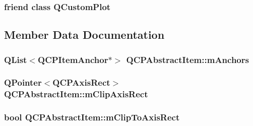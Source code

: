 \subsubsection[{Q\+Custom\+Plot}]{\setlength{\rightskip}{0pt plus 5cm}friend class {\bf Q\+Custom\+Plot}\hspace{0.3cm}{\ttfamily [friend]}}\label{class_q_c_p_abstract_item_a1cdf9df76adcfae45261690aa0ca2198}


\subsection{Member Data Documentation}
\hypertarget{class_q_c_p_abstract_item_a909a3abab783de302ebf0a0e6f2bbc15}{}
\subsubsection[{m\+Anchors}]{\setlength{\rightskip}{0pt plus 5cm}Q\+List$<${\bf Q\+C\+P\+Item\+Anchor}$\ast$$>$ Q\+C\+P\+Abstract\+Item\+::m\+Anchors\hspace{0.3cm}{\ttfamily [protected]}}\label{class_q_c_p_abstract_item_a909a3abab783de302ebf0a0e6f2bbc15}
\hypertarget{class_q_c_p_abstract_item_a3e57cfe7da4b1ac3d6fa7281ea437361}{}
\subsubsection[{m\+Clip\+Axis\+Rect}]{\setlength{\rightskip}{0pt plus 5cm}Q\+Pointer$<${\bf Q\+C\+P\+Axis\+Rect}$>$ Q\+C\+P\+Abstract\+Item\+::m\+Clip\+Axis\+Rect\hspace{0.3cm}{\ttfamily [protected]}}\label{class_q_c_p_abstract_item_a3e57cfe7da4b1ac3d6fa7281ea437361}
\hypertarget{class_q_c_p_abstract_item_ad2a70ff6b658fcb84a9427f69d3f587d}{}
\subsubsection[{m\+Clip\+To\+Axis\+Rect}]{\setlength{\rightskip}{0pt plus 5cm}bool Q\+C\+P\+Abstract\+Item\+::m\+Clip\+To\+Axis\+Rect\hspace{0.3cm}{\ttfamily [protected]}}\label{class_q_c_p_abstract_item_ad2a70ff6b658fcb84a9427f69d3f587d}
\hypertarget{class_q_c_p_abstract_item_af94ff71b6a15ea6d028ab8bd8eccd012}{}
